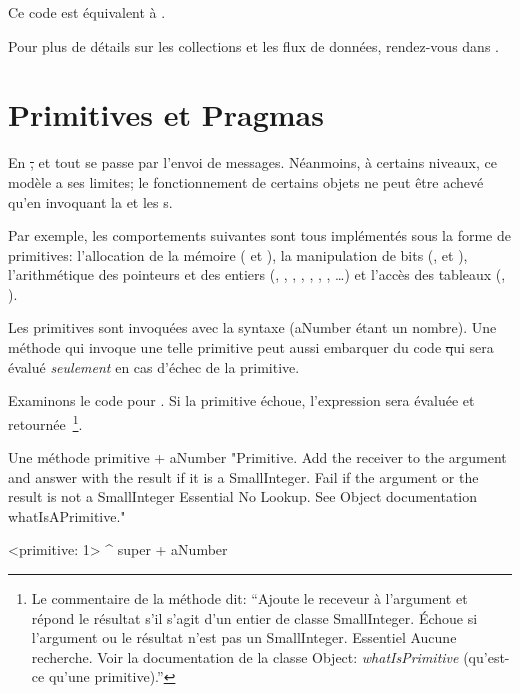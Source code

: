 \documentclass[a4paper,10pt,twoside]{book}
\begin{document}
\noindent
Ce code est \'{e}quivalent \`{a} .

Pour plus de d\'{e}tails sur les collections et les flux de donn\'ees,
rendez-vous dans .

\section{Primitives et Pragmas}

En \st, \mantra et tout se passe par l'envoi de messages.
N\'{e}anmoins, \`{a} certains niveaux, ce mod\`ele a ses limites;
le fonctionnement de certains objets ne peut \^{e}tre achev\'e qu'en
invoquant la  et les s.

Par exemple, les comportements suivantes sont tous impl\'{e}ment\'{e}s 
sous la forme de primitives:
l'allocation de la m\'{e}moire ( et ),
la manipulation de bits (,
 et ),
l'arithm\'{e}tique des pointeurs et des entiers (\ct{+}, \ct{-},  \ct{<},  \ct{>}, \ct{*}, \ct{/ }, \ct{=}, \ct{==}\ldots)
et l'acc\`{e}s des tableaux (, ).

Les primitives sont invoqu\'{e}es avec la syntaxe   (aNumber \'etant un nombre).
Une m\'{e}thode qui invoque une telle primitive peut aussi embarquer
du code \st qui sera \'{e}valu\'{e}  \emph{seulement} en cas d'\'echec
de la primitive.

Examinons le code pour .
Si la primitive \'{e}choue, l'expression  sera
\'{e}valu\'{e}e et retourn\'{e}e~\footnote{Le commentaire de la
  m\'ethode dit: ``Ajoute le receveur \`a l'argument et r\'epond le
  r\'esultat s'il s'agit d'un entier de classe SmallInteger. \'Echoue
  si l'argument ou le r\'esultat n'est pas un
  SmallInteger. Essentiel Aucune recherche. Voir la documentation de
  la classe Object: \emph{whatIsPrimitive} (qu'est-ce qu'une primitive).''}.

\begin{method}[primitive]{Une m\'ethode primitive}
+ aNumber 
  "Primitive. Add the receiver to the argument and answer with the result
  if it is a SmallInteger. Fail if the argument or the result is not a
  SmallInteger  Essential  No Lookup. See Object documentation whatIsAPrimitive."

  <primitive: 1>
  ^ super + aNumber
\end{method}
\end{document}
